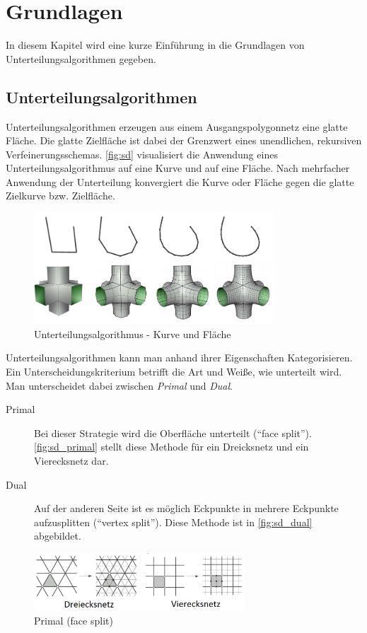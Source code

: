 \chapter{Grundlagen}

In diesem Kapitel wird eine kurze Einführung in die Grundlagen von Unterteilungsalgorithmen gegeben.

\section{Unterteilungsalgorithmen}

Unterteilungsalgorithmen erzeugen aus einem Ausgangspolygonnetz eine glatte Fläche.
Die glatte Zielfläche ist dabei der Grenzwert eines unendlichen, rekursiven Verfeinerungsschemas.
\autoref{fig:sd} visualisiert die Anwendung eines Unterteilungsalgorithmus auf eine Kurve und auf eine Fläche.
Nach mehrfacher Anwendung der Unterteilung konvergiert die Kurve oder Fläche gegen die glatte Zielkurve bzw. Zielfläche.

\begin{figure}
  \centering
  \includegraphics[width=0.8\textwidth]{content/media/sd.png}
  \caption{Unterteilungsalgorithmus - Kurve und Fläche \cite{Standford.24.07.2015}}
  \label{fig:sd}
\end{figure}

Unterteilungsalgorithmen kann man anhand ihrer Eigenschaften Kategorisieren.
Ein Unterscheidungskriterium betrifft die Art und Weiße, wie unterteilt wird.
Man unterscheidet dabei zwischen \emph{Primal} und \emph{Dual}.

\begin{description}
 \item[Primal] Bei dieser Strategie wird die Oberfläche unterteilt (\enquote{face split}).
\autoref{fig:sd_primal} stellt diese Methode für ein Dreicksnetz und ein Vierecksnetz dar.
 \item[Dual] Auf der anderen Seite ist es möglich Eckpunkte in mehrere Eckpunkte aufzusplitten (\enquote{vertex split}).
 Diese Methode ist in \autoref{fig:sd_dual} abgebildet.

\end{description}
\begin{figure}
  \centering
  \includegraphics[width=0.7\textwidth]{content/media/sd_primal}
  \caption{Primal (face split) \cite{Standford.24.07.2015}}
  \label{fig:sd_primal}
\end{figure}

